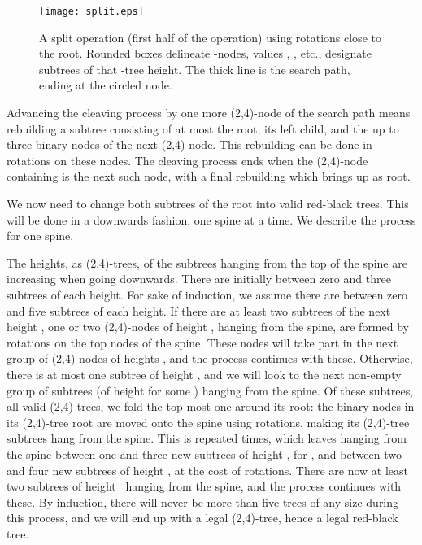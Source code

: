 \documentclass[letterpaper,11pt]{article}
\begin{document}
\begin{figure}\begin{center}
        \texttt{[image: split.eps]}
    \end{center}
    \caption{\label{fig-split-from-root} A split operation (first half of
    the operation) using rotations close to the root. Rounded boxes
    delineate -nodes, values , , etc., designate subtrees of
    that -tree height. The thick line is the search path, ending at
    the circled node.}
\end{figure}

Advancing the cleaving process by one more (2,4)-node of the search path
means rebuilding a subtree consisting of at most the root, its left child,
and the up to three binary nodes of the next (2,4)-node. This rebuilding
can be done in  rotations on these nodes. The cleaving process ends
when the (2,4)-node containing  is the next such node, with a final
rebuilding which brings  up as root.

We now need to change both subtrees of the root into valid red-black
trees. This will be done in a downwards fashion, one spine at a time. We
describe the process for one spine.

The heights, as (2,4)-trees, of the subtrees hanging from the top of the
spine are increasing when going downwards. There are initially between zero
and three subtrees of each height. For sake of induction, we assume there
are between zero and five subtrees of each height. If there are at least
two subtrees of the next height , one or two (2,4)-nodes of height
, hanging from the spine, are formed by rotations on the top nodes of
the spine. These nodes will take part in the next group of (2,4)-nodes of
heights , and the process continues with these. Otherwise, there is at
most one subtree of height , and we will look to the next non-empty
group of subtrees (of height  for some ) hanging from the
spine. Of these subtrees, all valid (2,4)-trees, we fold the top-most one
around its root: the binary nodes in its (2,4)-tree root are moved onto the
spine using rotations, making its (2,4)-tree subtrees hang from the
spine. This is repeated  times, which leaves hanging from the spine
between one and three new subtrees of height , for , and between two and four new subtrees of height , at the cost of
 rotations. There are now at least two subtrees of height~ hanging
from the spine, and the process continues with these. By induction, there
will never be more than five trees of any size during this process, and we
will end up with a legal (2,4)-tree, hence a legal red-black tree.
\end{document}
